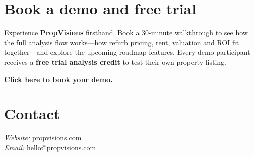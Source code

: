 \documentclass[11pt,a4paper]{article}
\begin{document}
\section*{Book a demo and free trial}
Experience \textbf{PropVisions} firsthand.  
Book a 30-minute walkthrough to see how the full analysis flow works—how refurb pricing, rent, valuation and ROI fit together—and explore the upcoming roadmap features.  
Every demo participant receives a \textbf{free trial analysis credit} to test their own property listing.

\vspace{0.5em}
\textcolor{Accent}{\textbf{\href{https://calendly.com/hello-propvisions/30min}{Click here to book your demo.}}}

\section*{Contact}
\textit{Website:} \href{https://www.propvisions.com}{propvisions.com} \\
\textit{Email:} \href{mailto:hello@propvisions.com}{hello@propvisions.com}
\end{document}
